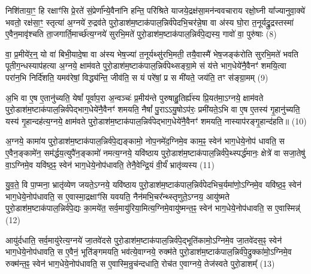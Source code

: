 निशि॑ताया॒ꣳ॒ हि रक्षाꣳ॑सि प्रे॒रते॑ सं॒प्रेर्णा᳚न्ये॒वैना॑नि हन्ति॒ परि॑श्रिते याजये॒द्रक्ष॑सा॒मन॑न्ववचाराय रक्षो॒घ्नी या᳚ज्यानुवा॒क्ये॑ भवतो॒ रक्ष॑सा॒ꣳ॒ स्तृत्या॑ अ॒ग्नये॑ रु॒द्रव॑ते पुरो॒डाश॑म॒ष्टाक॑पाल॒न्निर्व॑पेदभि॒चर॑न्ने॒षा वा अ॑स्य घो॒रा त॒नूर्यद्रु॒द्रस्तस्मा॑ ए॒वैन॒मावृ॑श्चति ता॒जगार्ति॒मार्च्छ॑त्य॒ग्नये॑ सुरभि॒मते॑ पुरो॒डाश॑म॒ष्टाक॑पाल॒न्निर्व॑पे॒द्यस्य॒ गावो॑ वा॒ पुरु॑षाः (8)

वा॒ प्र॒मीये॑र॒न्॒ यो वा॑ बिभी॒यादे॒षा वा अ॑स्य भेष॒ज्या॑ त॒नूर्यथ्सु॑रभि॒मती॒ तयै॒वास्मै॑ भेष॒जङ्क॑रोति सुरभि॒मते॑ भवति पूतीग॒न्धस्याप॑हत्या अ॒ग्नये॒ क्षाम॑वते पुरो॒डाश॑म॒ष्टाक॑पाल॒न्निर्व॑पेथ्सङ्ग्रा॒मे सं य॑त्ते भाग॒धेये॑नै॒वैनꣳ॑ शमयि॒त्वा परा॑न॒भि निर्दि॑शति॒ यमव॑रेषां॒ विद्ध्य॑न्ति॒ जीव॑ति॒ स यं परे॑षां॒ प्र स मी॑यते॒ जय॑ति॒ तꣳ स॑ङ्ग्रा॒मम् (9)

अ॒भि वा ए॒ष ए॒तानु॑च्यति॒ येषां᳚ पूर्वाप॒रा अ॒न्वञ्चः॑ प्र॒मीय॑न्ते पुरुषाहु॒तिर्ह्य॑स्य प्रि॒यत॑मा॒\-ऽग्नये॒ क्षाम॑वते पुरो॒डाश॑म॒ष्टाक॑पाल॒न्निर्व॑पेद्भाग॒धेये॑नै॒वैनꣳ॑ शमयति॒ नैषां᳚ पु॒रा\-ऽ\-ऽयु॒षो\-ऽप॑रः॒ प्रमी॑यते॒\-ऽभि वा ए॒ष ए॒तस्य॑ गृ॒हानु॑च्यति॒ यस्य॑ गृ॒हान्दह॑त्य॒ग्नये॒ क्षाम॑वते पुरो॒डाश॑म॒ष्टाक॑पाल॒न्निर्व॑पेद्भाग॒धेये॑नै॒वैनꣳ॑ शमयति॒ नास्याप॑रङ्गृ॒हान्द॑हति॥ (10)

{\anuvakamend[{व्र॒तप॑तये॒ निशि॑ताया॒न्निर्व॑पे॒त्पुरु॑षाः सङ्ग्रा॒मन्न च॒त्वारि॑ च॥२॥}]}

अ॒ग्नये॒ कामा॑य पुरो॒डाश॑म॒ष्टाक॑पाल॒न्निर्व॑पे॒द्यङ्कामो॒ नोप॒नमे॑द॒ग्निमे॒व काम॒ꣴ॒ स्वेन॑ भाग॒धेये॒नोप॑ धावति॒ स ए॒वैन॒ङ्कामे॑न॒ सम॑र्द्धय॒त्युपै॑न॒ङ्कामो॑ नमत्य॒ग्नये॒ यवि॑ष्ठाय पुरो॒डाश॑म॒ष्टाक॑पाल॒न्निर्व॑पे॒थ्स्पर्द्ध॑मानः॒ क्षेत्रे॑ वा सजा॒तेषु॑ वा॒\-ऽग्निमे॒व यवि॑ष्ठ॒ꣴ॒ स्वेन॑ भाग॒धेये॒नोप॑धावति॒ तेनै॒वेन्द्रि॒यं वी॒र्यं॑ भ्रातृ॑व्यस्य (11)

यु॒व॒ते॒ वि पा॒प्मना॒ भ्रातृ॑व्येण जयते॒\-ऽग्नये॒ यवि॑ष्ठाय पुरो॒डाश॑म॒ष्टाक॑पाल॒न्निर्व॑पेदभिच॒र्यमा॑णो॒\-ऽग्निमे॒व यवि॑ष्ठ॒ꣴ॒ स्वेन॑ भाग॒धेये॒नोप॑धावति॒ स ए॒वास्मा॒द्रक्षाꣳ॑सि यवयति॒ नैन॑मभि॒चर᳚न्थ्स्तृणुते॒\-ऽग्नय॒ आयु॑ष्मते पुरो॒डाश॑म॒ष्टाक॑पाल॒न्निर्व॑पे॒द्यः का॒मये॑त॒ सर्व॒मायु॑रिया॒मित्य॒ग्निमे॒वायु॑ष्मन्त॒ꣴ॒ स्वेन॑ भाग॒धेये॒नोप॑धावति॒ स ए॒वास्मिन्न्॑ (12)

आयु॑र्दधाति॒ सर्व॒मायु॑रेत्य॒ग्नये॑ जा॒तवे॑दसे पुरो॒डाश॑म॒ष्टाक॑पाल॒न्निर्व॑पे॒द्भूति॑कामो॒\-ऽग्निमे॒व जा॒तवे॑दस॒ꣴ॒ स्वेन॑ भाग॒धेये॒नोप॑धावति॒ स ए॒वैनं॒ भूति॑ङ्गमयति॒ भव॑त्ये॒वाग्नये॒ रुक्म॑ते पुरो॒डाश॑म॒ष्टाक॑पाल॒न्निर्व॑पे॒द्रुक्का॑मो॒\-ऽग्निमे॒व रुक्म॑न्त॒ꣴ॒ स्वेन॑ भाग॒धेये॒नोप॑धावति॒ स ए॒वास्मि॒न्रुच॑न्दधाति॒ रोच॑त ए॒वाग्नये॒ तेज॑स्वते पुरो॒डाशम्᳚ (13)

